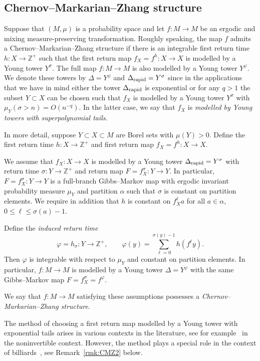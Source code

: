 \documentclass[AHL,Unicode,longabstracts,published]{cedram}
\newcommand{\Z}{\mathbb{Z}}
\newcommand{\DE}{\Delta_{\rm rapid}}
\begin{document}
\subsection{Chernov--Markarian--Zhang structure}
Suppose that $(M,\mu)$ is a probability space and let $f:M\to M$ be an ergodic and mixing measure-preserving transformation. Roughly speaking, the map $f$ admits a Chernov--Markarian--Zhang structure if there is an integrable first return time $h:X\to\Z^+$ such that the first return map $f_X=f^h:X\to X$ is modelled by a Young tower $Y^\sigma$. The full map $f:M\to M$ is also modelled by a Young tower $Y^\varphi$. We denote these towers by $\Delta=Y^\varphi$ and $\DE=Y^\sigma$ since in the applications that we have in mind either the tower $\DE$ is exponential or for any $q>1$ the subset $Y\subset X$ can be chosen such that $f_X$ is modelled by a Young tower $Y^\sigma$ with $\mu_Y(\sigma>n)=O(n^{-q})$. In the latter case, we say that $f_X$ is \emph{modelled by Young towers with superpolynomial tails}.

In more detail, suppose $Y\subset X\subset M$ are Borel sets with $\mu(Y)>0$. Define the first return time $h:X\to\Z^+$ and first return map $f_X=f^h:X\to X$.

We assume that $f_X:X\to X$ is modelled by a Young tower $\DE=Y^\sigma$ with return time $\sigma:Y\to\Z^+$ and return map $F=f_X^\sigma:Y\to Y$. In particular, $F=f_X^\sigma:Y\to Y$ is a full-branch Gibbs--Markov map with ergodic invariant probability measure $\mu_Y$ and partition $\alpha$ such that $\sigma$ is constant on partition elements. We require in addition that $h$ is constant on $f_X^\ell a$ for all $a\in\alpha$, $0\le\ell\le\sigma(a)-1$.

Define the \emph{induced return time}
\begin{equation}\label{eq:induce}
 \varphi=h_\sigma:Y\to\Z^+, \qquad
\varphi(y)=\sum_{\ell=0}^{\sigma(y)-1}h(f^\ell y).
\end{equation}
Then $\varphi$ is integrable with respect to $\mu_Y$ and constant on partition elements. In particular, $f:M\to M$ is modelled by a Young tower $\Delta=Y^\varphi$ with the same Gibbs--Markov map $F=f_X^\sigma=f^\varphi$.

We say that $f:M\to M$ satisfying these assumptions possesses a \emph{Chernov--Markarian--Zhang structure}.

\begin{rema}\label{rmk:CMZ}
The method of choosing a first return map modelled by a Young tower with exponential tails arises in various contexts in the literature, see for example~\cite{BruinLuzzattoStrien03,BruinTerhesiu18} in the noninvertible context. However, the method plays a special role in the context of billiards~\cite{ChernovZhang05,Markarian04}, see Remark~\ref{rmk:CMZ2} below.
\end{rema}
\end{document}
